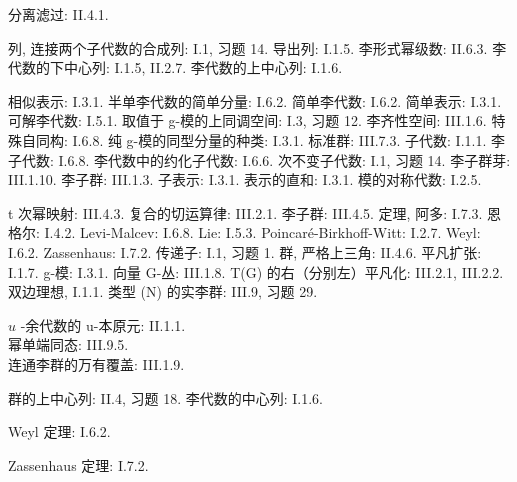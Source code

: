 分离滤过: II.4.1.

列, 连接两个子代数的合成列: I.1, 习题 14. 导出列: I.1.5. 李形式幂级数: II.6.3. 李代数的下中心列: I.1.5, II.2.7. 李代数的上中心列: I.1.6.

相似表示: I.3.1. 半单李代数的简单分量: I.6.2. 简单李代数: I.6.2. 简单表示: I.3.1. 可解李代数: I.5.1. 取值于 g-模的上同调空间: I.3, 习题 12. 李齐性空间: III.1.6. 特殊自同构: I.6.8. 纯 g-模的同型分量的种类: I.3.1. 标准群: III.7.3. 子代数: I.1.1. 李子代数: I.6.8. 李代数中的约化子代数: I.6.6. 次不变子代数: I.1, 习题 14. 李子群芽: III.1.10. 李子群: III.1.3. 子表示: I.3.1. 表示的直和: I.3.1. 模的对称代数: I.2.5.

t 次幂映射: III.4.3. 复合的切运算律: III.2.1. 李子群: III.4.5. 定理, 阿多: I.7.3. 恩格尔: I.4.2. Levi-Malcev: I.6.8. Lie: I.5.3. Poincaré-Birkhoff-Witt: I.2.7. Weyl: I.6.2. Zassenhaus: I.7.2. 传递子: I.1, 习题 1. 群, 严格上三角: II.4.6. 平凡扩张: I.1.7. g-模: I.3.1. 向量 G-丛: III.1.8. T(G) 的右（分别左）平凡化: III.2.1, III.2.2. 双边理想, I.1.1. 类型 (N) 的实李群: III.9, 习题 29.

\(u\) -余代数的 u-本原元: II.1.1.\\
幂单端同态: III.9.5.\\
连通李群的万有覆盖: III.1.9.

群的上中心列: II.4, 习题 18. 李代数的中心列: I.1.6.

Weyl 定理: I.6.2.

Zassenhaus 定理: I.7.2.

